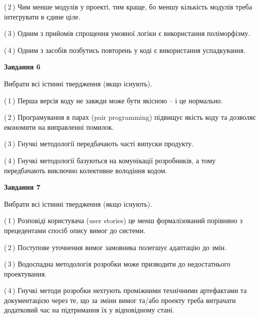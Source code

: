 \documentclass[10pt, ukrainian]{article}
\begin{document}
{\begin {large}
(\,2\,) Чим менше модулів у проекті, тим краще, бо меншу кількість модулів треба інтегрувати в єдине ціле. %



(\,3\,) Одним з прийомів спрощення умовної логіки є використання поліморфізму. %



(\,4\,) Одним з засобів позбутись повторень у коді є використання успадкування. %

\newpage

{\begin {center}\textbf{Завдання 6}\end {center}}\par
Вибрати всі істинні твердження (якщо існують).\par
\vspace{2mm}



(\,1\,) Перша версія коду не завжди може бути якісною -- і це нормально. %



(\,2\,) Програмування в парах (pair programming) підвищує якість коду та дозволяє економити на виправленні помилок. %



(\,3\,) Гнучкі методології передбачають часті випуски продукту. %



(\,4\,) Гнучкі методології базуються на комунікації розробників, а тому передбачають виключно колективне володіння кодом. %


{\begin {center}\textbf{Завдання 7}\end {center}}\par
Вибрати всі істинні твердження (якщо існують).\par
\vspace{2mm}



(\,1\,) Розповіді користувача (user stories) це менш формалізований порівняно з прецедентами спосіб опису вимог до системи. %



(\,2\,) Поступове уточнення вимог замовника полегшує адаптацію до змін. %



(\,3\,) Водоспадна методологія розробки може призводити до недостатнього проектування. %



(\,4\,) Гнучкі методи розробки нехтують проміжними технічними артефактами та документацією через те, що за зміни вимог та/або проекту треба витрачати додатковий час на підтримання їх у відповідному стані. %



\end{large}}
\end{document}
